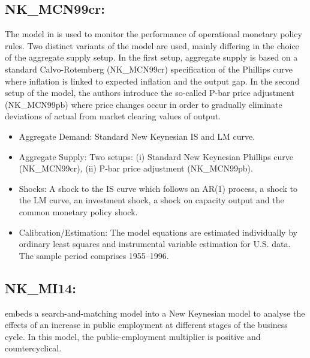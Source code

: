 \documentclass[11pt,a4paper]{article}
\begin{document}
	\subsection{NK\_MCN99cr: \texorpdfstring{\cite{McCallumNelson1999}}{McCallum and Nelson (1999)}}
	\label{NKMCN99cr}
	The model in \cite{McCallumNelson1999} is used to monitor the performance of operational monetary policy rules. Two distinct variants of the model are used, mainly differing in the choice of the aggregate supply setup. In the first setup, aggregate supply is based on a standard Calvo-Rotemberg (NK\_MCN99cr) specification of the Phillips curve where inflation is linked to expected inflation and the output gap. In the second setup of the model, the authors introduce the so-called P-bar price adjustment (NK\_MCN99pb) where price changes occur in order to gradually eliminate deviations of actual from market clearing values of output.
	\begin{itemize}
		\item Aggregate Demand: Standard New Keynesian IS and LM curve.
		\item Aggregate Supply: Two setups: (i) Standard New Keynesian Phillips curve (NK\_MCN99cr), (ii) P-bar price adjustment (NK\_MCN99pb).
		\item Shocks: A shock to the IS curve which follows an AR(1) process, a shock to the LM curve, an investment shock, a shock on capacity output and the common monetary policy shock.
		\item Calibration/Estimation: The model equations are estimated individually by ordinary least squares and instrumental variable estimation for U.S. data. The sample period comprises 1955--1996.
	\end{itemize}
	
	
	
	\subsection{NK\_MI14: \texorpdfstring{\cite{michaillat2014atheory}}{Machaillat (2014)}}
	\label{NKMI14}
	\cite{michaillat2014atheory} embeds a search-and-matching model into a New Keynesian model to analyse the effects of an increase in public employment at different stages of the business cycle. In this model, the public-employment multiplier is positive and countercyclical.
	
\end{document}
